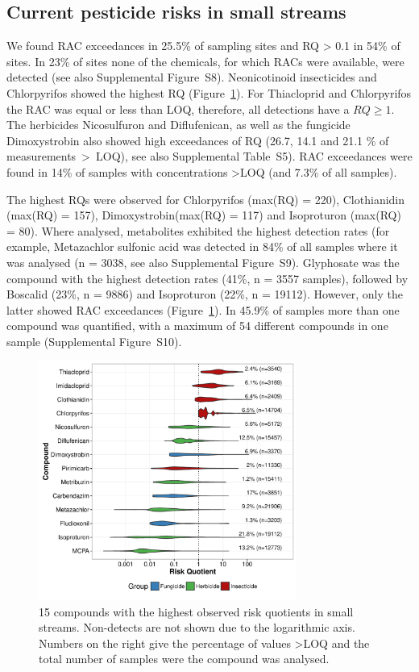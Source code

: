 \documentclass[journal=esthag,manuscript=article]{achemso}
\begin{document}
\subsection{Current pesticide risks in small streams}
We found RAC exceedances in 25.5\% of sampling sites and RQ > 0.1 in 54\% of sites. 
In 23\% of sites none of the chemicals, for which RACs were available, were detected (see also Supplemental Figure~S8).
Neonicotinoid insecticides and Chlorpyrifos showed the highest RQ (Figure~\ref{fig:fig6}). %
For Thiacloprid and Chlorpyrifos the RAC was equal or less than LOQ, therefore, all detections have a $RQ \ge 1$. 
The herbicides Nicosulfuron and Diflufenican, as well as the fungicide Dimoxystrobin also showed high exceedances of RQ (26.7, 14.1 and 21.1 \% of measurements~\textgreater~LOQ), see also Supplemental Table~S5).
RAC exceedances were found in 14\% of samples with concentrations \textgreater LOQ (and 7.3\% of all samples).

The highest RQs were observed for Chlorpyrifos (max(RQ) = 220), Clothianidin (max(RQ) = 157), Dimoxystrobin(max(RQ) = 117) and Isoproturon (max(RQ) = 80). 
Where analysed, metabolites exhibited the highest detection rates (for example, Metazachlor sulfonic acid was detected in 84\% of all samples where it was analysed (n = 3038, see also Supplemental Figure~S9).
Glyphosate was the compound with the highest detection rates (41\%, n = 3557 samples), followed by Boscalid (23\%, n = 9886) and Isoproturon (22\%, n = 19112). 
However, only the latter showed RAC exceedances (Figure~\ref{fig:fig6}).
In 45.9\% of samples more than one compound was quantified, with a maximum of 54 different compounds in one sample (Supplemental Figure~S10). 

\begin{figure}[ht]
  \includegraphics[width=3.33in]{figure6.pdf}
  \caption{15 compounds with the highest observed risk quotients in small streams. Non-detects are not shown due to the logarithmic axis. Numbers on the right give the percentage of values \textgreater LOQ and the total number of samples were the compound was analysed.
  }
  \label{fig:fig6}
\end{figure}
\end{document}
